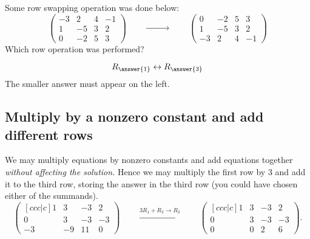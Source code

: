 \documentclass{ximera}
\begin{document}
\begin{question}
  Some row swapping operation was done below:
  \[
    \begin{pmatrix}
      -3 & 2 & 4 & -1 \\
      1 & -5 & 3 & 2 \\
      0 & -2 & 5 & 3
    \end{pmatrix}
    \qquad\xrightarrow{\phantom{R_1 \leftrightarrow R_3}}\qquad
    \begin{pmatrix}
      0 & -2 & 5 & 3 \\
      1 & -5 & 3 & 2 \\
      -3 & 2 & 4 & -1
    \end{pmatrix}
  \]
  Which row operation was performed?
  \begin{prompt}
    \[
      R_{\answer{1}} \leftrightarrow R_{\answer{3}}
    \]
    The smaller answer must appear on the left.
  \end{prompt}
\end{question}


\subsection{Multiply by a nonzero constant and add different rows}
We may multiply equations by nonzero constants and add equations together
\emph{without affecting the solution.} Hence we may multiply the first
row by $3$ and add it to the third row, storing the answer in the
third row (you could have chosen either of the summands).
\[
  \begin{pmatrix}[ccc|c]
    1 &   3 & -3 & 2  \\
    0 &   3 & -3 & -3 \\
    -3& -9  & 11 & 0
  \end{pmatrix}
  \qquad\xrightarrow{3R_1+R_3\rightarrow R_3}\qquad
  \begin{pmatrix}[ccc|c]
    1 &   3 & -3 & 2  \\
    0 &   3 & -3 & -3 \\
    0& 0  & 2 & 6
  \end{pmatrix}.
\]

\begin{question}
\end{question}
\end{document}
